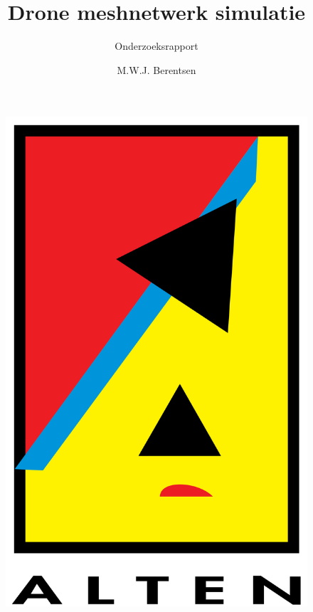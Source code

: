 \documentclass[a4paper, 11pt, oneside]{report}
\author{M.W.J. Berentsen}
\title{\myfont Drone meshnetwerk simulatie}
\subtitle{Onderzoeksrapport}{Hogeschool van Arnhem en Nijmegen}{HBO Technische Informatica}{561399}{MWJ.Berentsen@student.han.nl}{Versie 1}{Alten Nederland B.V.}{Docent: J. Visch, MSc}{Assessor: ir. C.G.R. van Uffelen}
\begin{document}
\begin{figure}
\begin{center}\includegraphics[scale=0.1]{alten}\end{center}
\end{figure}
\maketitle

\end{document}
